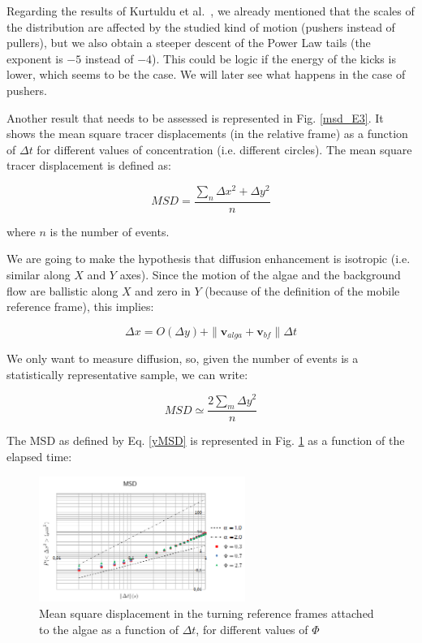 Regarding the results of Kurtuldu et al.~\cite{Kurtuldu2011}, we already mentioned that the scales of the distribution are affected by the studied kind of motion (pushers instead of pullers), but we also obtain a steeper descent of the Power Law tails (the exponent is $-5$ instead of $-4$). This could be logic if the energy of the kicks is lower, which seems to be the case. We will later see what happens in the case of pushers.

Another result that needs to be assessed is represented in Fig. \ref{msd_E3}. It shows the mean square tracer displacements (in the relative frame) as a function of  $\Delta t$ for different values of concentration (i.e. different circles). The mean square tracer displacement is defined as:

\begin{equation}
MSD = \frac{\displaystyle\sum_{n} \Delta x ^ 2 + \Delta y ^ 2}{n}
\end{equation}

where $n$ is the number of events. 

We are going to make the hypothesis that diffusion enhancement is isotropic (i.e. similar along $X$ and $Y$ axes). Since the motion of the algae and the background flow are ballistic along $X$ and zero in $Y$ (because of the definition of the mobile reference frame), this implies:

\begin{equation}
\Delta x = O(\Delta y) + \| \mathbf{v}_{alga} + \mathbf{v}_{bf} \| \Delta t
\end{equation}

We only want to measure diffusion, so, given the number of events is a statistically representative sample, we can write:

\begin{equation}
MSD \simeq \frac{2 \displaystyle\sum_{m} \Delta y^{2}}{n}
\label{yMSD}
\end{equation}

The MSD as defined by Eq. \ref{yMSD} is represented in Fig. \ref{MSD_e3} as a function of the elapsed time:

\begin{figure}[H]
	\centering
	\includegraphics[width=0.6\textwidth]{archivos/MSD_e3.png}
	\caption{Mean square displacement in the turning reference frames attached to the algae as a function of $\Delta t$, for different values of $\Phi$}
	\label{MSD_e3}
\end{figure}


